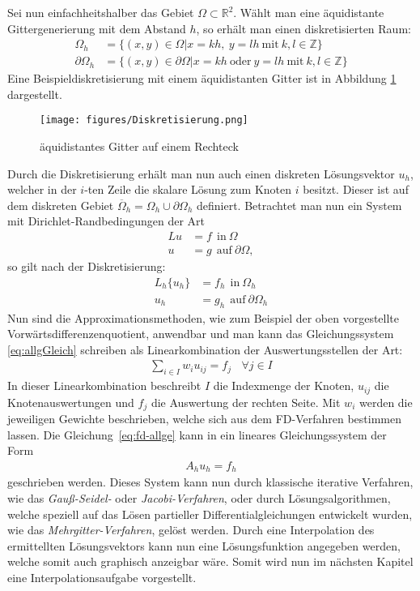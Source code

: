 \documentclass[12pt,titlepage]{article}
\begin{document}
Sei nun einfachheitshalber das Gebiet $\Omega\subset\mathbb{R}^2$. Wählt man eine äquidistante Gittergenerierung mit dem Abstand $h$, so erhält man einen diskretisierten Raum:
\begin{align}
 \Omega_h&=\{(x,y)\in\Omega|x=kh,~y=lh~\text{mit}~k,l\in\mathbb{Z}\}\nonumber\\
 \partial\Omega_h&=\{(x,y)\in\partial\Omega|x=kh~\text{oder}~y=lh~\text{mit}~k,l\in\mathbb{Z}\}\nonumber
\end{align}
Eine Beispieldiskretisierung mit einem äquidistanten Gitter ist in Abbildung \ref{fig:diskGit} dargestellt.
\begin{figure}[ht]
	\centering
	\texttt{[image: figures/Diskretisierung.png]}
	\caption[Diskretiesierung]{äquidistantes Gitter auf einem Rechteck}
	\label{fig:diskGit}
\end{figure}
Durch die Diskretisierung erhält man nun auch einen diskreten Lösungsvektor $u_h$, welcher in der $i$-ten Zeile die skalare Lösung zum Knoten $i$ besitzt. Dieser ist auf dem diskreten Gebiet $\overline{\Omega}_h=\Omega_h\cup\partial\Omega_h$ definiert. Betrachtet man nun ein System mit Dirichlet-Randbedingungen der Art
\begin{align}
 Lu&=f~~\text{in}~\Omega\nonumber\\
 u&=g~~\text{auf}~\partial\Omega\nonumber,
\end{align}
so gilt nach der Diskretisierung:
\begin{align}
 L_h\{u_h\}&=f_h~~\text{in}~\Omega_h\nonumber\\
 u_h&=g_h~~\text{auf}~\partial\Omega_h\label{eq:allgGleich}
\end{align}
Nun sind die Approximationsmethoden, wie zum Beispiel der oben vorgestellte Vorwärtsdifferenzenquotient, anwendbar und man kann das Gleichungssystem \eqref{eq:allgGleich} schreiben als Linearkombination der Auswertungsstellen der Art:
\begin{align}
 \sum_{i\in I}w_iu_{ij}=f_j~~~~\forall j\in I\label{eq:fd-allge}
\end{align}
In dieser Linearkombination beschreibt $I$ die Indexmenge der Knoten, $u_{ij}$ die Knotenauswertungen und $f_j$ die Auswertung der rechten Seite. Mit $w_i$ werden die jeweiligen Gewichte beschrieben, welche sich aus dem FD-Verfahren bestimmen lassen. Die Gleichung~\eqref{eq:fd-allge} kann in ein lineares Gleichungssystem der Form
\begin{align}
 A_hu_h=f_h
\end{align}
geschrieben werden. Dieses System kann nun durch klassische iterative Verfahren, wie das \textit{Gauß-Seidel-} oder \textit{Jacobi-Verfahren}, oder durch Lösungsalgorithmen, welche speziell auf das Lösen partieller Differentialgleichungen entwickelt wurden, wie das \textit{Mehrgitter-Verfahren}, gelöst werden. Durch eine Interpolation des ermittellten Lösungsvektors kann nun eine Lösungsfunktion angegeben werden, welche somit auch graphisch anzeigbar wäre. Somit wird nun im nächsten Kapitel eine Interpolationsaufgabe vorgestellt.
\end{document}
